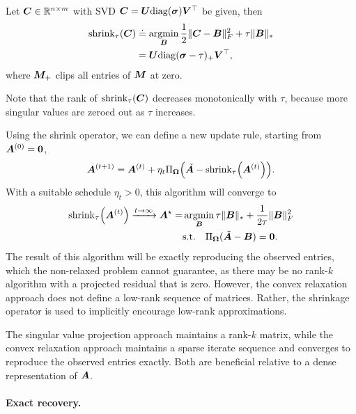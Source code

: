 \begin{theorem}
    Let $\bm{C} \in \mathbb{R}^{n\times m}$ with SVD $\bm{C} = \bm{U} \mathrm{diag}(\bm{\sigma}) \bm{V}^\top$ be given, then
    \begin{align*}
        \mathrm{shrink}_{\tau}(\bm{C}) & \doteq \operatorname*{argmin}_{\bm{B}} \frac{1}{2} \| \bm{C} - \bm{B} \|_F^2 + \tau \| \bm{B} \|_* \\
                                        & = \bm{U}\mathrm{diag}(\bm{\sigma} - \tau)_+ \bm{V}^\top,
    \end{align*}
    where $\bm{M}_+$ clips all entries of $\bm{M}$ at zero.
\end{theorem}
Note that the rank of $\mathrm{shrink}_{\tau}(\bm{C})$ decreases monotonically with $\tau$, because
more singular values are zeroed out as $\tau$ increases.

Using the shrink operator, we can define a new update rule, starting from $\bm{A}^{(0)} =
    \bm{0}$, \[
    \mat{A}^{(t+1)} = \mat{A}^{(t)} + \eta_t \Pi_{\mat{\Omega}}\lft( \tilde{\mat{A}} - \mathrm{shrink}_{\tau}\lft( \mat{A}^{(t)} \rgt) \rgt).
\]
With a suitable schedule $\eta_t > 0$, this algorithm will converge to
\begin{align*}
    \mathrm{shrink}_{\tau}\lft( \mat{A}^{(t)} \rgt) \xrightarrow{t\to \infty} \mat{A}^\star = & \argmin_{\mat{B}} \tau \| \mat{B} \|_* + \frac{1}{2\tau} \| \mat{B} \|_F^2   \\
                                                                                              & \mathrm{s.t.} \quad \Pi_{\mat{\Omega}}(\tilde{\mat{A}} - \mat{B}) = \mat{0}.
\end{align*}
The result of this algorithm will be exactly reproducing the observed entries, which the non-relaxed
problem cannot guarantee, as there may be no rank-$k$ algorithm with a projected residual that is
zero. However, the convex relaxation approach does not define a low-rank sequence of matrices.
Rather, the shrinkage operator is used to implicitly encourage low-rank approximations.

\begin{important}
    The singular value projection approach maintains a rank-$k$ matrix, while the convex
    relaxation approach maintains a sparse iterate sequence and converges to reproduce the observed
    entries exactly. Both are beneficial relative to a dense representation of $\bm{A}$.
\end{important}

\paragraph{Exact recovery.}

